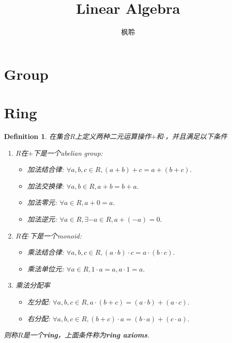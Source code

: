 \documentclass{article}
\newtheorem{definition}[theorem]{Definition}
\begin{document}
\title{Linear Algebra}
\author{枫聆}
\maketitle

\tableofcontents

\newpage	
\section{Group}


\newpage
\section{Ring}

\begin{definition}
\rm 在集合$R$上定义两种二元运算操作$+$和$\cdot$，并且满足以下条件
\begin{enumerate}
	\item $R$在$+$下是一个abelian group:
	\begin{itemize}
		\item 加法结合律: $\forall a,b,c \in R, (a+b)+c = a+(b+c).$
		\item 加法交换律: $\forall a,b \in R, a+b=b+a.$
		\item 加法零元: $\forall a \in R, a+0 = a.$
		\item 加法逆元: $\forall a \in R, \exists -a \in R,  a+(-a)=0.$
	\end{itemize}
	\item $R$在$\cdot$下是一个monoid:
	\begin{itemize}
		\item 乘法结合律: $\forall a,b,c \in R, (a\cdot b)\cdot c = a \cdot (b \cdot c).$
		\item 乘法单位元: $\forall a \in R, 1 \cdot a = a , a \cdot 1 = a.$
	\end{itemize}
	\item 乘法分配率
	\begin{itemize}
		\item 左分配: $\forall a,b,c \in R , a\cdot (b+c) = (a\cdot b) + (a \cdot c).$
		\item 右分配: $\forall a,b,c \in R , (b+c) \cdot a = (b \cdot a)+(c \cdot a).$
	\end{itemize}
\end{enumerate}
则称$R$是一个\textbf{ring}，上面条件称为\textbf{ring axioms}.
\end{definition}

\newpage
\end{document}
